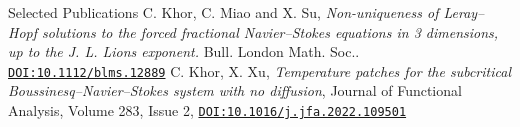 \begin{rubric}{Selected Publications}
  \entry*[2023\myhori{} ]C. Khor, C. Miao and X. Su, \emph{Non-uniqueness of Leray--Hopf solutions to the forced fractional Navier--Stokes equations in 3 dimensions, up to the J. L. Lions exponent.} Bull. London Math. Soc.. \href{https://doi.org/10.1112/blms.12889}{\texttt{DOI:10.1112/blms.12889}}
  \entry*[2022\myhori{} ]C. Khor, X. Xu,
  \emph{Temperature patches for the subcritical Boussinesq--Navier--Stokes system with no diffusion},
Journal of Functional Analysis,
Volume 283, Issue 2,
\href{https://doi.org/10.1016/j.jfa.2022.109501}{\texttt{DOI:10.1016/j.jfa.2022.109501}}
\end{rubric}
  
